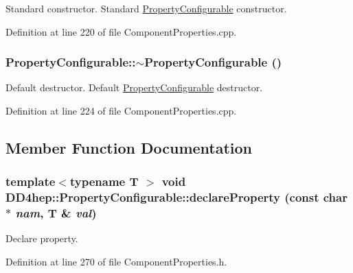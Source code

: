 Standard constructor. Standard \hyperlink{class_d_d4hep_1_1_property_configurable}{PropertyConfigurable} constructor. 

Definition at line 220 of file ComponentProperties.cpp.\hypertarget{class_d_d4hep_1_1_property_configurable_a49ef91ca6bbdf3f9d835e5f18f3a3a27}{
\subsubsection[{$\sim$PropertyConfigurable}]{\setlength{\rightskip}{0pt plus 5cm}PropertyConfigurable::$\sim$PropertyConfigurable ()}}
\label{class_d_d4hep_1_1_property_configurable_a49ef91ca6bbdf3f9d835e5f18f3a3a27}


Default destructor. Default \hyperlink{class_d_d4hep_1_1_property_configurable}{PropertyConfigurable} destructor. 

Definition at line 224 of file ComponentProperties.cpp.

\subsection{Member Function Documentation}
\hypertarget{class_d_d4hep_1_1_property_configurable_a6e52fd581e87ae0e81a5690d071f58dc}{
\subsubsection[{declareProperty}]{\setlength{\rightskip}{0pt plus 5cm}template$<$typename T $>$ void DD4hep::PropertyConfigurable::declareProperty (const char $\ast$ {\em nam}, \/  {\bf T} \& {\em val})}}
\label{class_d_d4hep_1_1_property_configurable_a6e52fd581e87ae0e81a5690d071f58dc}


Declare property. 

Definition at line 270 of file ComponentProperties.h.

